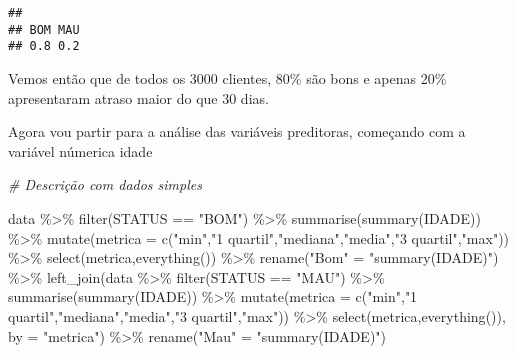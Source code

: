 \documentclass[
]{book}
\newenvironment{Shaded}{\begin{snugshade}}{\end{snugshade}}
\newcommand{\AttributeTok}[1]{\textcolor[rgb]{0.77,0.63,0.00}{#1}}
\newcommand{\CommentTok}[1]{\textcolor[rgb]{0.56,0.35,0.01}{\textit{#1}}}
\newcommand{\FunctionTok}[1]{\textcolor[rgb]{0.00,0.00,0.00}{#1}}
\newcommand{\NormalTok}[1]{#1}
\newcommand{\OtherTok}[1]{\textcolor[rgb]{0.56,0.35,0.01}{#1}}
\newcommand{\SpecialCharTok}[1]{\textcolor[rgb]{0.00,0.00,0.00}{#1}}
\newcommand{\StringTok}[1]{\textcolor[rgb]{0.31,0.60,0.02}{#1}}
\begin{document}
\begin{verbatim}
## 
## BOM MAU 
## 0.8 0.2
\end{verbatim}

Vemos então que de todos os 3000 clientes, 80\% são bons e apenas 20\% apresentaram atraso maior do que 30 dias.

Agora vou partir para a análise das variáveis preditoras, começando com a variável númerica idade

\begin{Shaded}
\begin{Highlighting}[]
\CommentTok{\# Descrição com dados simples}

\NormalTok{data }\SpecialCharTok{\%\textgreater{}\%}
  \FunctionTok{filter}\NormalTok{(STATUS }\SpecialCharTok{==} \StringTok{"BOM"}\NormalTok{) }\SpecialCharTok{\%\textgreater{}\%}
  \FunctionTok{summarise}\NormalTok{(}\FunctionTok{summary}\NormalTok{(IDADE)) }\SpecialCharTok{\%\textgreater{}\%}
  \FunctionTok{mutate}\NormalTok{(}\AttributeTok{metrica =} \FunctionTok{c}\NormalTok{(}\StringTok{"min"}\NormalTok{,}\StringTok{"1 quartil"}\NormalTok{,}\StringTok{"mediana"}\NormalTok{,}\StringTok{"media"}\NormalTok{,}\StringTok{"3 quartil"}\NormalTok{,}\StringTok{"max"}\NormalTok{)) }\SpecialCharTok{\%\textgreater{}\%}
  \FunctionTok{select}\NormalTok{(metrica,}\FunctionTok{everything}\NormalTok{()) }\SpecialCharTok{\%\textgreater{}\%}
  \FunctionTok{rename}\NormalTok{(}\StringTok{"Bom"} \OtherTok{=} \StringTok{"summary(IDADE)"}\NormalTok{) }\SpecialCharTok{\%\textgreater{}\%}
  \FunctionTok{left\_join}\NormalTok{(data }\SpecialCharTok{\%\textgreater{}\%}
              \FunctionTok{filter}\NormalTok{(STATUS }\SpecialCharTok{==} \StringTok{"MAU"}\NormalTok{) }\SpecialCharTok{\%\textgreater{}\%}
              \FunctionTok{summarise}\NormalTok{(}\FunctionTok{summary}\NormalTok{(IDADE)) }\SpecialCharTok{\%\textgreater{}\%}
              \FunctionTok{mutate}\NormalTok{(}\AttributeTok{metrica =} \FunctionTok{c}\NormalTok{(}\StringTok{"min"}\NormalTok{,}\StringTok{"1 quartil"}\NormalTok{,}\StringTok{"mediana"}\NormalTok{,}\StringTok{"media"}\NormalTok{,}\StringTok{"3 quartil"}\NormalTok{,}\StringTok{"max"}\NormalTok{)) }\SpecialCharTok{\%\textgreater{}\%}
              \FunctionTok{select}\NormalTok{(metrica,}\FunctionTok{everything}\NormalTok{()), }\AttributeTok{by =} \StringTok{"metrica"}\NormalTok{) }\SpecialCharTok{\%\textgreater{}\%}
  \FunctionTok{rename}\NormalTok{(}\StringTok{"Mau"} \OtherTok{=} \StringTok{"summary(IDADE)"}\NormalTok{)}
\end{Highlighting}
\end{Shaded}
\end{document}
